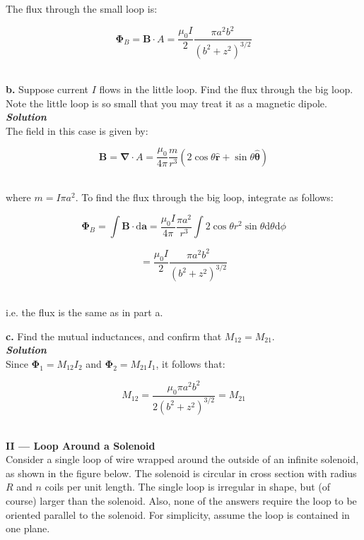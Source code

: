 \documentclass[14pt]{extarticle}
\renewcommand{\v}[1]{{\bm #1}}
\newcommand{\hv}[1]{\hat{\bm{#1}}}
\newcommand{\bfit}[1]{\textbf{\textit{#1}}}
\renewcommand{\d}{\text{d}}
\renewcommand{\div}{\boldsymbol \nabla \cdot}
\newcommand{\muo}{\mu_0}
\begin{document}
The flux through the small loop is:

$$\v \Phi_B = \v B \cdot A = \frac{\muo I}{2} \frac{\pi a^2 b^2}{(b^2+z^2)^{3/2}}$$ \ 





\dotfill 

\hfill 

{\Large \bf b.} Suppose current $I$ flows in the little loop. Find the flux through the big loop. Note the little loop is so small that you may treat it as a magnetic dipole. \\ 

{\bfit{Solution}} \\ 

The field in this case is given by:

$$\v B = \div A = \frac{\muo}{4\pi} \frac{m}{r^3} (2\cos\theta \hv r + \sin\theta \hv \theta)$$ \ 

where $m = I\pi a^2$. To find the flux through the big loop, integrate as follows:

$$\v \Phi_B =  \int \v B \cdot \d \v a = \frac{\muo I}{4\pi} \frac{\pi a^2}{r^3} \int 2\cos\theta r^2\sin\theta \d \theta \d \phi$$  

$$= \frac{\muo I}{2} \frac{\pi a^2 b^2}{(b^2+z^2)^{3/2}}$$ \ 

i.e. the flux is the same as in part a. \\ 





\dotfill 

\hfill 

{\Large \bf c.} Find the mutual inductances, and confirm that $M_{12} = M_{21}$. \\  

{\bfit{Solution}} \\ 

Since $\v \Phi_1 = M_{12} I_2$ and $\v \Phi_2 = M_{21} I_1$, it follows that:

$$M_{12} = \frac{\muo \pi a^2 b^2}{2(b^2+z^2)^{3/2}} = M_{21}$$ \ 




\hrulefill 

{\LARGE \bf II --- Loop Around a Solenoid} \\ 

Consider a single loop of wire wrapped around the outside of an infinite solenoid, as shown in the figure below. The solenoid is circular in cross section with radius $R$ and $n$ coils per unit length. The single loop is irregular in shape, but (of course) larger than the  solenoid.  Also, none of the  answers require the  loop to be oriented parallel  to the solenoid. For simplicity, assume the loop is contained in one plane. 
\end{document}
